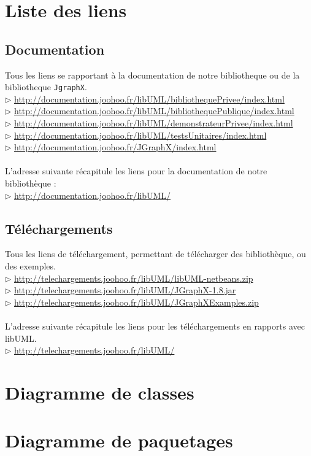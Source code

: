 \documentclass[12pt,a4paper,oneside]{book}
\begin{document}
	\chapter{Liste des liens}\label{listeLiens}
	\section{Documentation}
	Tous les liens se rapportant à la documentation de notre bibliotheque ou de la bibliotheque \texttt{JgraphX}.\\
	$\rhd$ \url{http://documentation.joohoo.fr/libUML/bibliothequePrivee/index.html}\\
	$\rhd$ \url{http://documentation.joohoo.fr/libUML/bibliothequePublique/index.html}\\
	$\rhd$ \url{http://documentation.joohoo.fr/libUML/demonstrateurPrivee/index.html}\\
	$\rhd$ \url{http://documentation.joohoo.fr/libUML/testsUnitaires/index.html}\\
	$\rhd$ \url{http://documentation.joohoo.fr/JGraphX/index.html}\\  \\

	L'adresse suivante récapitule les liens pour la documentation de notre bibliothèque : \\
	$\rhd$ \url{http://documentation.joohoo.fr/libUML/}\\

	\section{Téléchargements}
	Tous les liens de téléchargement, permettant de télécharger des bibliothèque, ou des exemples.\\
	$\rhd$ \url{http://telechargements.joohoo.fr/libUML/libUML-netbeans.zip}\\
	$\rhd$ \url{http://telechargements.joohoo.fr/libUML/JGraphX-1.8.jar}\\
	$\rhd$ \url{http://telechargements.joohoo.fr/libUML/JGraphXExamples.zip}\\ \\
	L'adresse suivante récapitule les liens pour les téléchargements en rapports avec libUML. \\
	$\rhd$ \url{http://telechargements.joohoo.fr/libUML/}\\ 

	
	\chapter{Diagramme de classes} \label{diagClasses}
	\nouveauChapitre
	
	\chapter{Diagramme de paquetages} \label{diagPaquetages}
	\nouveauChapitre
	
\end{document}
